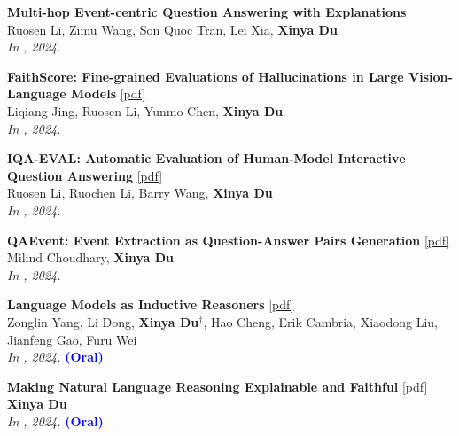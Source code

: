 \begin{enumerate}[{[}1{]},leftmargin=*]
\item 
{\bf Multi-hop Event-centric Question Answering with Explanations} \\
Ruosen Li, Zimu Wang, Son Quoc Tran, Lei Xia, \textbf{Xinya Du}  \\
{\it In \Neurips, 2024.} \\


\item 
{\bf FaithScore: Fine-grained Evaluations of Hallucinations in Large Vision-Language Models} 
\href{https://arxiv.org/pdf/2311.01477}{{[pdf]}} \\
Liqiang Jing, Ruosen Li, Yunmo Chen, \textbf{Xinya Du}  \\
{\it In \EMNLPfinding, 2024.} \\

\item
{\bf IQA-EVAL: Automatic Evaluation of Human-Model Interactive Question Answering}  
\href{https://arxiv.org/pdf/2408.13545}{{[pdf]}} \\
Ruosen Li, Ruochen Li, Barry Wang, \textbf{Xinya Du} \\
{\it In \Neurips, 2024.} \\

\parbox{\textwidth}{
\item 
{\bf QAEvent: Event Extraction as Question-Answer Pairs Generation} 
\href{https://aclanthology.org/2024.findings-eacl.126.pdf}{{[pdf]}} \\
Milind Choudhary, \textbf{Xinya Du} \\
{\it In \EACLfinding, 2024.} \\
}

\parbox{\textwidth}{
\item 
{\bf Language Models as Inductive Reasoners} 
\href{https://aclanthology.org/2024.eacl-long.13.pdf}{{[pdf]}} \\
Zonglin Yang, Li Dong, \textbf{Xinya Du}$^{\dagger}$, Hao Cheng, Erik Cambria, Xiaodong Liu, Jianfeng Gao, Furu Wei \\
{\it In \EACL, 2024.} {\textcolor{blue}{\textbf{(Oral)}}} \\ 
}

\parbox{\textwidth}{
\item 
{\bf Making Natural Language Reasoning Explainable and Faithful} 
      \href{https://ojs.aaai.org/index.php/AAAI/article/view/30280}{{[pdf]}} \\
      \textbf{Xinya Du} \\
{\it In \AAAI, 2024.} {\textcolor{blue}{\textbf{(Oral)}}} \\ 
}


\end{enumerate}
